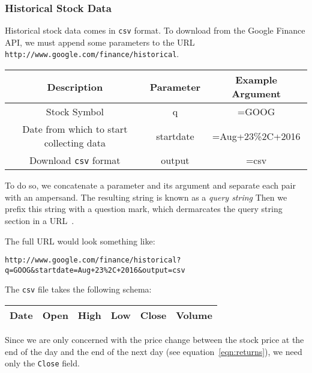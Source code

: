\documentclass[../Dissertation.tex]{subfiles}
\begin{document}
\subsubsection{Historical Stock Data}

Historical stock data comes in \lstinline|csv| format.
To download from the Google Finance API, we must append some parameters to the URL \lstinline|http://www.google.com/finance/historical|.
\begin{center}
 \begin{tabular}{||c c c||} 
 \hline
 Description & Parameter & Example Argument \\ [0.5ex] 
 \hline\hline
 Stock Symbol & q & =GOOG\\ 
 \hline
 Date from which to start collecting data & startdate & =Aug+23\%2C+2016 \\
 \hline
 Download \lstinline|csv| format & output & =csv \\ [1ex] 
 \hline
\end{tabular}
\end{center}
To do so, we concatenate a parameter and its argument and separate each pair with an ampersand.
The resulting string is known as a \textit{query string}
Then we prefix this string with a question mark, which dermarcates the query string section in a URL~\cite{Wiki:QueryString}.

The full URL would look something like:
\begin{center}
\lstinline|http://www.google.com/finance/historical?q=GOOG&startdate=Aug+23%2C+2016&output=csv|
\end{center}


The \lstinline|csv| file takes the following schema:
\begin{center}
 \begin{tabular}{||c | c | c | c | c | c||} 
 \hline
 Date & Open & High & Low & Close & Volume \\ [0.5ex] 
 \hline
\end{tabular}
\end{center}
Since we are only concerned with the price change between the stock price at the end of the day and the end of the next day (see equation~\ref{eqn:returns}), we need only the \lstinline|Close| field.
\end{document}
